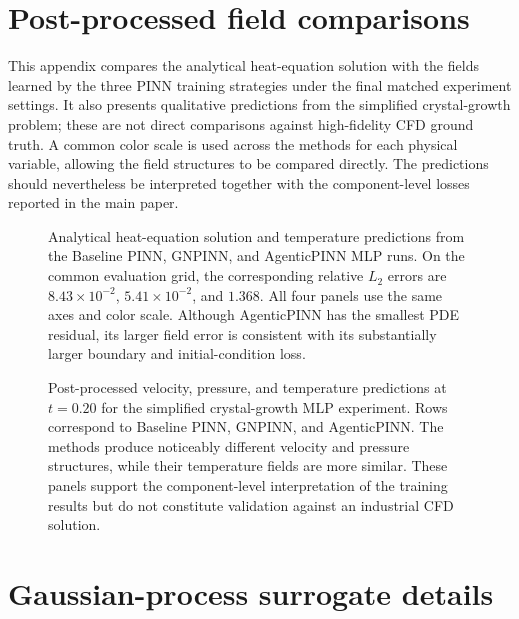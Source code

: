 \documentclass{article}
\begin{document}
\clearpage

%

\clearpage

\appendix
\section{Post-processed field comparisons}
\label{app:field_comparisons}

This appendix compares the analytical heat-equation solution with the fields learned by the three PINN training strategies under the final matched experiment settings. It also presents qualitative predictions from the simplified crystal-growth problem; these are not direct comparisons against high-fidelity CFD ground truth. A common color scale is used across the methods for each physical variable, allowing the field structures to be compared directly. The predictions should nevertheless be interpreted together with the component-level losses reported in the main paper.

\begin{figure}[h!]
    \centering
    
    \caption{Analytical heat-equation solution and temperature predictions from the Baseline PINN, GNPINN, and AgenticPINN MLP runs. On the common evaluation grid, the corresponding relative $L_2$ errors are $8.43\times10^{-2}$, $5.41\times10^{-2}$, and $1.368$. All four panels use the same axes and color scale. Although AgenticPINN has the smallest PDE residual, its larger field error is consistent with its substantially larger boundary and initial-condition loss.}
    \label{fig:appendix_heat_fields}
\end{figure}


\begin{figure}[h!]
    \centering
    
    \caption{Post-processed velocity, pressure, and temperature predictions at $t=0.20$ for the simplified crystal-growth MLP experiment. Rows correspond to Baseline PINN, GNPINN, and AgenticPINN. The methods produce noticeably different velocity and pressure structures, while their temperature fields are more similar. These panels support the component-level interpretation of the training results but do not constitute validation against an industrial CFD solution.}
    \label{fig:appendix_crystal_fields}
\end{figure}

\section{Gaussian-process surrogate details}
\label{app:gpr_details}
\end{document}
